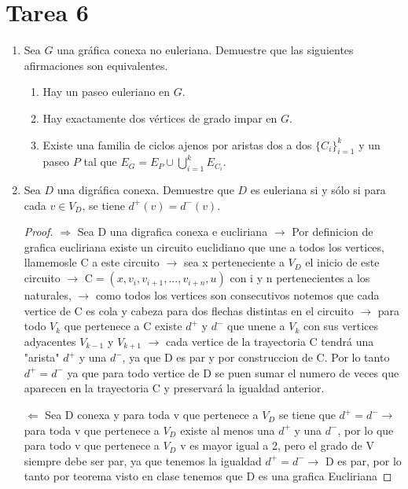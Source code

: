 \documentclass{article}
\begin{document}
\section*{\LARGE{Tarea 6}}
\begin{enumerate}
\item Sea $G$ una gr\'afica conexa no euleriana.   Demuestre que
  las siguientes afirmaciones son equivalentes.
  \begin{enumerate}
  \item Hay un paseo euleriano en $G$.

  \item Hay exactamente dos v\'ertices de grado impar en $G$.

  \item Existe una familia de ciclos ajenos por aristas dos
    a dos $\{ C_i \}_{i=1}^k$ y un paseo $P$ tal que
    $E_G = E_P \cup \bigcup_{i=1}^k E_{C_i}$.
  \end{enumerate}

\item Sea $D$ una digr\'afica conexa. Demuestre que $D$ es
  euleriana si y s\'olo si  para cada $v \in V_D$, se tiene
  $d^+(v) = d^-(v)$.

  \begin{proof} 
    $\Longrightarrow$ Sea D una digrafica conexa e eucliriana $\rightarrow$ Por definicion de grafica eucliriana existe un circuito euclidiano que une a todos los vertices, llamemosle C a este circuito $\rightarrow$ sea x perteneciente a $V_D$ el inicio de este circuito $\rightarrow$ C$=(x,v_i, v_{i+1},...,v_{i+n},u)$ con i y n pertenecientes a los naturales, $\rightarrow$ como todos los vertices son consecutivos notemos que cada vertice de C es cola y cabeza para dos flechas distintas en el circuito $\rightarrow$ para todo $V_k$ que pertenece a C existe $d^+$ y $d^-$ que unene a $V_k$ con sus vertices adyacentes  $V_{k-1}$ y $V_{k+1}$  $\rightarrow$ cada vertice de la trayectoria C tendrá  una "arista" $d^+$ y una $d^-$, ya que D es par y por construccion de C.
    Por lo tanto $d^+=d^-$ ya que para todo vertice de D se puen sumar el numero de veces que aparecen en la trayectoria C y preservará la igualdad anterior.
    
    
    
    $\Longleftarrow$ Sea D conexa y para toda v que pertenece a $V_D$ se tiene que $d^+ = d^- \rightarrow$ para toda v que pertenece a $V_D$ existe al menos una $d^+$ y una $d^-$, por lo que para todo v que pertenece a $V_D$ v es mayor igual a 2, pero el grado de V siempre debe ser par, ya que tenemos la igualdad $d^+=d^- \rightarrow$ D es par, por lo tanto por teorema visto en clase tenemos que D es una grafica Eucliriana 
    

\end{proof}
\end{enumerate}
\end{document}
